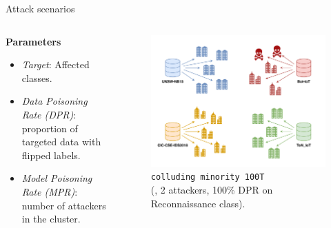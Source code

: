 \begin{frame}{Attack scenarios}
    \begin{columns}
        \begin{column}{.5\textwidth}
            \textbf{Parameters}
            \begin{itemize}
                \item \textit{Target}: Affected classes.
                \item \textit{Data Poisoning Rate (DPR)}: proportion of targeted data with flipped labels.
                \item \textit{Model Poisoning Rate (MPR)}: number of attackers in the cluster.
            \end{itemize}
        \end{column}
        \begin{column}{.5\textwidth}
          \begin{figure}
            \captionsetup{font=small, labelfont=small}
            \includegraphics[width=\linewidth]{figures/eval/setup/poisoning.pdf}%
            \captionsetup{justification=centering}
            \caption*{
              \texttt{colluding minority 100T}\\
              \smaller (\ie, 2 attackers, 100\% DPR on Reconnaissance class).
            }
          \end{figure}
        \end{column}
    \end{columns}
\end{frame}

